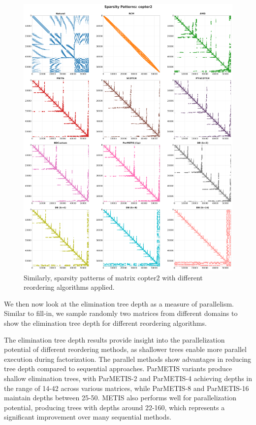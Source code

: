 \begin{figure}[h]
\centering
\includegraphics[width=\textwidth]{fig/res/copter2_sparsity_patterns.png}
\caption{Similarly, sparsity patterns of matrix copter2 with different reordering algorithms applied.}
\label{fig:copter2-sparsity-patterns}
\end{figure}

We then now look at the elimination tree depth as a measure of parallelism. Similar to fill-in, we sample randomly two matrices from different domains to show the elimination tree depth for different reordering algorithms.

The elimination tree depth results provide insight into the parallelization potential of different reordering methods, as shallower trees enable more parallel execution during factorization. The parallel methods show advantages in reducing tree depth compared to sequential approaches. ParMETIS variants produce shallow elimination trees, with ParMETIS-2 and ParMETIS-4 achieving depths in the range of 14-42 across various matrices, while ParMETIS-8 and ParMETIS-16 maintain depths between 25-50. METIS also performs well for parallelization potential, producing trees with depths around 22-160, which represents a significant improvement over many sequential methods.

